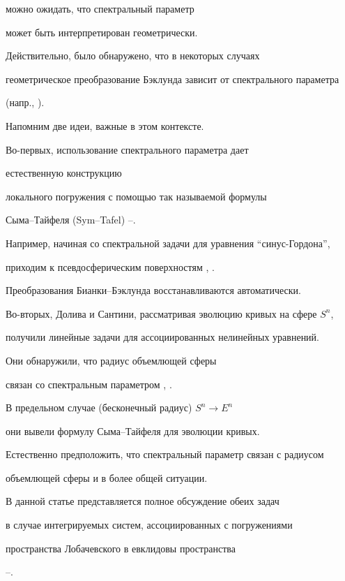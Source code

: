 можно ожидать, что спектральный параметр


может быть интерпретирован геометрически.


Действительно, было обнаружено, что в некоторых случаях


геометрическое преобразование Бэклунда зависит от спектрального параметра


(напр., \cite{Sym}).





Напомним две идеи, важные в этом контексте.


Во-первых, использование спектрального параметра дает


естественную конструкцию


локального погружения с помощью так называемой формулы


Сыма--Тайфеля (Sym--Tafel) \cite{Ci-FG}--\cite{S-2}.


Например, начиная со спектральной задачи для уравнения ``синус-Гордона'',


приходим к псевдосферическим поверхностям \cite{S-2}, \cite{Sym}.


Преобразования Бианки--Бэклунда восстанавливаются автоматически.





Во-вторых, Долива и Сантини, рассматривая эволюцию кривых на сфере $S^n$,


получили линейные задачи для ассоциированных нелинейных уравнений.


Они обнаружили, что радиус объемлющей сферы


связан со спектральным параметром \cite{DS0}, \cite{DS2}.


В предельном случае (бесконечный радиус) $S^n \rightarrow E^n$


они вывели формулу Сыма--Тайфеля для эволюции кривых.


Естественно предположить, что спектральный параметр связан с радиусом


объемлющей сферы и в более общей ситуации.





В данной статье представляется полное обсуждение обеих задач


в случае интегрируемых систем, ассоциированных с погружениями


пространства Лобачевского в евклидовы пространства


\cite{Am77}--\cite{Te}.


